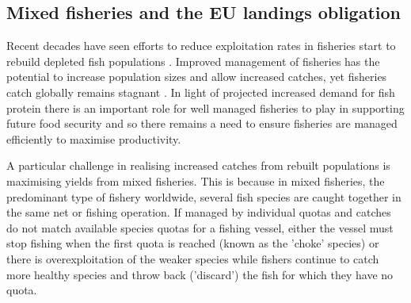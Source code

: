 \documentclass{nature}
\begin{document}
\begin{linenumbers}
\section*{}

\subsection{Mixed fisheries and the EU landings obligation} 

Recent decades have seen efforts to reduce exploitation rates in fisheries
start to rebuild depleted fish populations \cite{Worm2009}.  Improved
management of fisheries has the potential to increase population sizes and
allow increased catches, yet fisheries catch globally remains stagnant
\cite{FAO2016}.  In light of projected increased demand for fish protein
\cite{B??n??2016} there is an important role for well managed fisheries to play
in supporting future food security \cite{Mcclanahan2015} and so there remains a
need to ensure fisheries are managed efficiently to maximise productivity.

A particular challenge in realising increased catches from rebuilt populations
is maximising yields from mixed fisheries. This is because in mixed fisheries,
the predominant type of fishery worldwide, several fish species are caught
together in the same net or fishing operation. If managed by individual quotas
and catches do not match available species quotas for a fishing vessel, either
the vessel must stop fishing when the first quota is reached (known as the
'choke' species) or there is overexploitation of the weaker species while
fishers continue to catch more healthy species and throw back ('discard') the
fish for which they have no quota.


\end{linenumbers}
\end{document}
